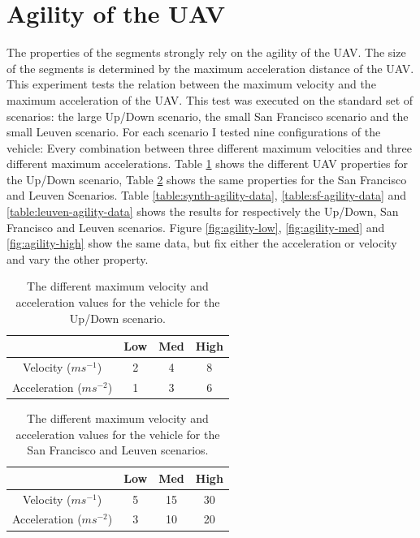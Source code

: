 \clearpage
\section{Agility of the UAV}
\label{subsec:agility}
The properties of the segments strongly rely on the agility of the UAV. The size of the segments is determined by the maximum acceleration distance of the UAV. \\
This experiment tests the relation between the maximum velocity and the maximum acceleration of the UAV. This test was executed on the standard set of scenarios: the large Up/Down scenario, the small San Francisco scenario and the small Leuven scenario. For each scenario I tested nine configurations of the vehicle: Every combination between three different maximum velocities and three different maximum accelerations. Table \ref{table:synth-agility} shows the different UAV properties for the Up/Down scenario, Table \ref{table:sf-leuven-agility} shows the same properties for the San Francisco and Leuven Scenarios. Table \ref{table:synth-agility-data}, \ref{table:sf-agility-data} and \ref{table:leuven-agility-data} shows the results for respectively the Up/Down, San Francisco and Leuven scenarios. Figure \ref{fig:agility-low}, \ref{fig:agility-med} and \ref{fig:agility-high} show the same data, but fix either the acceleration or velocity and vary the other property. \\

\begin{table}[h]
\centering
\begin{tabular}{ c || c | c | c}
 & Low & Med & High \\
\hline\hline
Velocity ($ms^{-1}$) 	& 2		& 4		& 8 	\\ 
\hline
Acceleration ($ms^{-2}$)& 1		& 3 	& 6 	\\  
\end{tabular}
\caption{The different maximum velocity and acceleration values for the vehicle for the Up/Down scenario.}
\label{table:synth-agility}
\end{table}

\begin{table}[h]
\centering
\begin{tabular}{ c || c | c | c}
 & Low & Med & High \\
\hline\hline
Velocity ($ms^{-1}$) 	& 5		& 15	& 30 	\\ 
\hline
Acceleration ($ms^{-2}$)& 3		& 10	& 20 	\\  
\end{tabular}
\caption{The different maximum velocity and acceleration values for the vehicle for the San Francisco and Leuven scenarios.}
\label{table:sf-leuven-agility}
\end{table}

